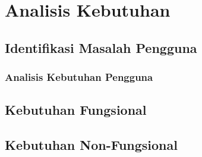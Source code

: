 \section{Analisis Kebutuhan}
\label{sec:analisis-kebutuhan}

\subsection{Identifikasi Masalah Pengguna}
\label{subsec:identifikasi-masalah-pengguna}
\subsubsection{Analisis Kebutuhan Pengguna}

\subsection{Kebutuhan Fungsional}
\label{subsec:kebutuhan-fungsional}

\subsection{Kebutuhan Non-Fungsional}
\label{subsec:kebutuhan-non-fungsional}